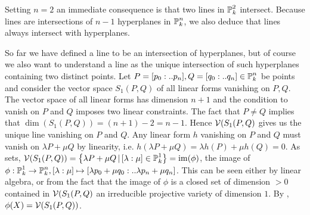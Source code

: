 \begin{corollary} \label{corollarySimpleIntersect}
Setting $n=2$ an immediate consequence is that two lines in $\operatorname{\mathbb P}^2_k$ intersect.
Because lines are intersections of $n-1$ hyperplanes in $\operatorname{\mathbb P}^n_k$, we also deduce that lines always intersect with hyperplanes.
\end{corollary}

So far we have defined a line to be an intersection of hyperplanes, but of course we also want to understand a line as the unique intersection of such hyperplanes containing two distinct points.
Let $P = [p_0:..p_n],Q=[q_0:..q_n] \in \operatorname{\mathbb P}^n_k$ be points and consider the vector space $S_1(P,Q)$ of all linear forms vanishing on $P,Q$.
The vector space of all linear forms has dimension $n+1$ and the condition to vanish on $P$ and $Q$ imposes two linear constraints.
The fact that $P\neq Q$ implies that $\dim(S_1(P,Q)) = (n+1) - 2 = n-1$.
Hence $\operatorname{\mathcal V}(S_1(P,Q)$ gives us the unique line vanishing on $P$ and $Q$.
Any linear form $h$ vanishing on $P$ and $Q$ must vanish on $\lambda P + \mu Q$ by linearity, i.e. $h(\lambda P + \mu Q) = \lambda h(P) + \mu h(Q) = 0$.
As sets, $\operatorname{\mathcal V}(S_1(P,Q)) = \left\lbrace\lambda P + \mu Q\,|\, [\lambda:\mu] \in \operatorname{\mathbb P}^1_k\right\rbrace = {\operatorname{im}}(\phi)$, the image of $\phi : \operatorname{\mathbb P}^1_k \to \operatorname{\mathbb P}^n_k, [\lambda:\mu] \mapsto [\lambda p_0+ \mu q_0:..\lambda p_n + \mu q_n]$.
This can be seen either by linear algebra, or from the fact that the image of $\phi$ is a closed set \cite[theorem 1.10]{shafarevich1994basic} of dimension $> 0$ contained in $\operatorname{\mathcal V}(S_1(P,Q)$ an irreducible projective variety of dimension $1$.
By \cite[theorem 1.19]{shafarevich1994basic}, $\phi(X) = \operatorname{\mathcal V}(S_1(P,Q))$.



